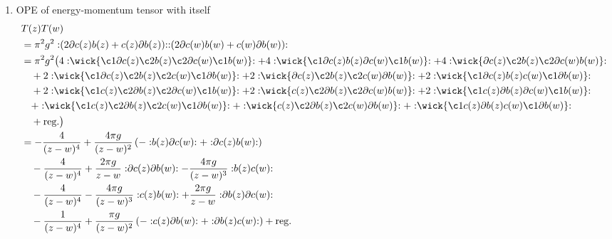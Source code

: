 \begin{enumerate}[label=(\alph*)]
	\item OPE of energy-momentum tensor with itself 
		\begin{align*}
				&T(z) T(w) \\
				&= \pi^2 g^2 \normord{(2\partial c(z) b(z) + c(z) \partial b(z))} \normord{(2\partial c(w) b(w) + c(w) \partial b(w))} \\
				&= \pi^2 g^2 \big( 4 \normord{\wick{ \c1  \partial c(z) \c2 b(z) \c2\partial c(w)\c1 b(w)}} +  4 \normord{\wick{ \c1  \partial c(z)  b(z) \partial c(w)\c1 b(w)}} + 4 \normord{\wick{   \partial c(z) \c2 b(z) \c2\partial c(w) b(w)}} \\
				&\quad +  2 \normord{\wick{\c1 \partial c(z) \c2 b(z) \c2 c(w) \c1 \partial b(w)}} +  2 \normord{\wick{ \partial c(z) \c2 b(z) \c2 c(w)  \partial b(w)}}  +  2 \normord{\wick{\c1 \partial c(z)  b(z)  c(w) \c1 \partial b(w)}} \\
				&\quad + 2 \normord{\wick{\c1 c(z) \c2 \partial b(z) \c2 \partial c(w) \c1 b(w)}} + 2 \normord{\wick{ c(z) \c2 \partial b(z) \c2 \partial c(w)  b(w)}} + 2 \normord{\wick{\c1 c(z)  \partial b(z)  \partial c(w) \c1 b(w)}}\\
				&\quad + \normord{\wick{\c1 c(z) \c2 \partial b(z) \c2 c(w) \c1 \partial b(w)}} + \normord{\wick{ c(z) \c2 \partial b(z) \c2 c(w)  \partial b(w)}}+ \normord{\wick{\c1 c(z)  \partial b(z)  c(w) \c1 \partial b(w)}}\\
						 &\quad + \text{reg.}\big) \\
						 &= -\frac{4}{(z-w)^4} +  \frac{4 \pi g}{(z-w)^2} \left( -\normord{b(z) \partial c (w)} + \normord{\partial c(z) b(w)} \right) \\
						 &\quad - \frac{4}{(z-w)^4} + \frac{2\pi g}{z-w} \normord{\partial c(z) \partial b(w)}  - \frac{4\pi g}{(z-w)^3} \normord{b(z) c(w)} \\
						 &\quad - \frac{4}{(z-w)^4} - \frac{4\pi g}{(z-w)^3} \normord{c(z) b(w)} + \frac{2\pi g}{z-w} \normord{\partial b(z) \partial c(w)} \\
						 &\quad -\frac{1}{(z-w)^4} + \frac{\pi g}{(z-w)^2} \left(- \normord{c(z) \partial b(w)} + \normord{\partial b(z) c(w)}\right) + \text{reg.} \\

\end{align*}
\end{enumerate}

